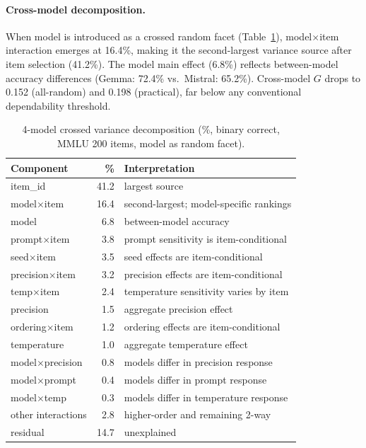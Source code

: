 \documentclass[11pt,letterpaper]{article}
\begin{document}
\paragraph{Cross-model decomposition.}
When model is introduced as a crossed random facet (Table~\ref{tab:cross_model}), model$\times$item interaction emerges at 16.4\%, making it the second-largest variance source after item selection (41.2\%).
The model main effect (6.8\%) reflects between-model accuracy differences (Gemma: 72.4\% vs.\ Mistral: 65.2\%).
Cross-model $G$ drops to 0.152 (all-random) and 0.198 (practical), far below any conventional dependability threshold.

\begin{table}[t]
\centering
\caption{4-model crossed variance decomposition (\%, binary correct, MMLU 200 items, model as random facet).}
\label{tab:cross_model}
\small
\begin{tabular}{@{}lrl@{}}
\toprule
Component & \% & Interpretation \\
\midrule
item\_id & 41.2 & largest source \\
model$\times$item & 16.4 & second-largest; model-specific rankings \\
model & 6.8 & between-model accuracy \\
prompt$\times$item & 3.8 & prompt sensitivity is item-conditional \\
seed$\times$item & 3.5 & seed effects are item-conditional \\
precision$\times$item & 3.2 & precision effects are item-conditional \\
temp$\times$item & 2.4 & temperature sensitivity varies by item \\
precision & 1.5 & aggregate precision effect \\
ordering$\times$item & 1.2 & ordering effects are item-conditional \\
temperature & 1.0 & aggregate temperature effect \\
model$\times$precision & 0.8 & models differ in precision response \\
model$\times$prompt & 0.4 & models differ in prompt response \\
model$\times$temp & 0.3 & models differ in temperature response \\
other interactions & 2.8 & higher-order and remaining 2-way \\
residual & 14.7 & unexplained \\
\bottomrule
\end{tabular}
\end{table}
\end{document}
